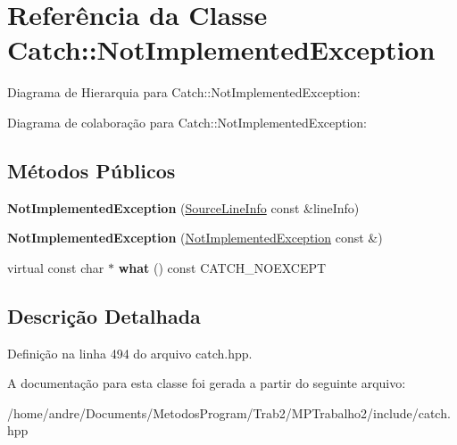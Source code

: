 \hypertarget{classCatch_1_1NotImplementedException}{}\section{Referência da Classe Catch\+:\+:Not\+Implemented\+Exception}
\label{classCatch_1_1NotImplementedException}


Diagrama de Hierarquia para Catch\+:\+:Not\+Implemented\+Exception\+:


Diagrama de colaboração para Catch\+:\+:Not\+Implemented\+Exception\+:
\subsection*{Métodos Públicos}
\begin{DoxyCompactItemize}
\item 
{\bfseries Not\+Implemented\+Exception} (\hyperlink{structCatch_1_1SourceLineInfo}{Source\+Line\+Info} const \&line\+Info)\hypertarget{classCatch_1_1NotImplementedException_ab4f0a5c39d8ffb72c664e2c07e180634}{}\label{classCatch_1_1NotImplementedException_ab4f0a5c39d8ffb72c664e2c07e180634}

\item 
{\bfseries Not\+Implemented\+Exception} (\hyperlink{classCatch_1_1NotImplementedException}{Not\+Implemented\+Exception} const \&)\hypertarget{classCatch_1_1NotImplementedException_a508a7a833455da2d3c10ea1a9d45e982}{}\label{classCatch_1_1NotImplementedException_a508a7a833455da2d3c10ea1a9d45e982}

\item 
virtual const char $\ast$ {\bfseries what} () const C\+A\+T\+C\+H\+\_\+\+N\+O\+E\+X\+C\+E\+PT\hypertarget{classCatch_1_1NotImplementedException_ad4c13963f1a8feacda0cd331adda89e3}{}\label{classCatch_1_1NotImplementedException_ad4c13963f1a8feacda0cd331adda89e3}

\end{DoxyCompactItemize}


\subsection{Descrição Detalhada}


Definição na linha 494 do arquivo catch.\+hpp.



A documentação para esta classe foi gerada a partir do seguinte arquivo\+:\begin{DoxyCompactItemize}
\item 
/home/andre/\+Documents/\+Metodos\+Program/\+Trab2/\+M\+P\+Trabalho2/include/catch.\+hpp\end{DoxyCompactItemize}
